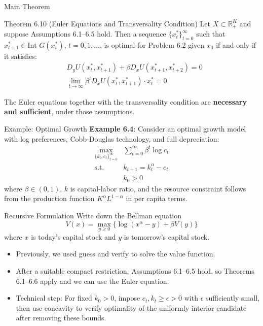 \documentclass[9pt,aspectratio=169]{beamer}
\begin{document}
\begin{frame}{Main Theorem}
\begin{block}{Theorem 6.10 (Euler Equations and Transversality Condition)}
    Let $X \subset \mathbb{R}^K_+$ and suppose Assumptions 6.1–6.5 hold. Then
    a sequence $\{x^*_t\}_{t=0}^{\infty}$ such that $x^*_{t+1} \in \text{Int
    } G(x^*_t)$, $t = 0,1,\ldots$, is optimal for Problem 6.2 given $x_0$
    if and only if it satisfies:
    \begin{align*}
        &D_y U(x^*_t, x^*_{t+1}) + \beta D_x U(x^*_{t+1}, x^*_{t+2}) = 0 \\
        &\lim_{t \to \infty} \beta^t D_x U(x^*_t, x^*_{t+1}) \cdot x^*_t = 0
    \end{align*}
\end{block}
The Euler equations together with the transversality condition are
\textbf{necessary and sufficient}, under those assumptions.
\end{frame}

\begin{frame}{Example: Optimal Growth}
    \textbf{Example 6.4}: Consider an optimal growth model with log
    preferences, Cobb-Douglas technology, and full depreciation:
    \begin{align*}
        \max_{\{k_t,c_t\}_{t=0}^{\infty}} &\sum_{t=0}^{\infty} \beta^t \log c_t \\
        \text{s.t. } &k_{t+1} = k_t^{\alpha} - c_t \\
        &k_0 > 0
    \end{align*}
    where $\beta \in (0,1)$, $k$ is capital-labor ratio, and the resource
    constraint follows from the production function $K^{\alpha}L^{1-\alpha}$
    in per capita terms.
\end{frame}

\begin{frame}{Recursive Formulation}
Write down the Bellman equation
\begin{equation*}
V(x) = \max_{y \geq 0} \{\log(x^{\alpha} - y) + \beta V(y)\}
\end{equation*}
where $x$ is today's capital stock and $y$ is tomorrow's capital stock.

\begin{itemize}
    \item Previously, we used guess and verify to solve the value function.
    \item After a suitable compact restriction, Assumptions 6.1--6.5 hold,
    so Theorems 6.1--6.6 apply and we can use the Euler equation.
    \item Technical step: For fixed $k_0 > 0$, impose $c_t,k_t \geq \epsilon > 0$
    with $\epsilon$ sufficiently small, then use concavity to verify optimality
    of the uniformly interior candidate after removing these bounds.
\end{itemize}
\end{frame}
\end{document}
